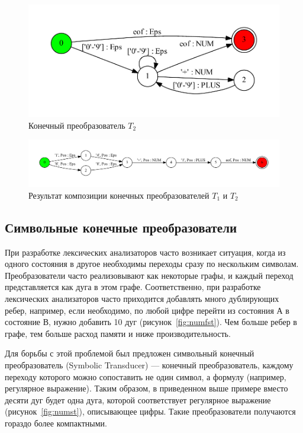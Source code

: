 \documentclass[14pt]{matmex-diploma}
\begin{document}
\begin{figure}[h!]
        \includegraphics[width=13cm]{../pictures/lexer_.pdf}
        \caption{Конечный преобразователь $T_2$}
        \label{compose2} 
\end{figure}

\begin{figure}[h!]
        \includegraphics[width=\linewidth]{../pictures/res_.pdf}
        \caption{Результат композиции конечных преобразователей $T_1$ и $T_2$}
        \label{compose3} 
\end{figure}

\subsection{Символьные конечные преобразователи}
При разработке лексических анализаторов часто возникает ситуация, когда из одного состояния в другое необходимы переходы сразу по нескольким символам. Преобразователи часто реализовывают как некоторые графы, и каждый переход представляется как дуга в этом графе. Соответственно, при разработке лексических анализаторов часто приходится добавлять много дублирующих ребер, например, если необходимо, по любой цифре перейти из состояния А в состояние В, нужно добавить 10 дуг (рисунок~\ref{fig:numfst}). Чем больше ребер в графе, тем больше расход памяти и ниже производительность.

Для борьбы с этой проблемой был предложен символьный конечный преобразователь (Symbolic Transducer) --- конечный преобразователь,  каждому переходу которого можно сопоставить не один символ, а формулу (например, регулярное выражение). Таким образом, в приведенном выше примере вместо десяти дуг будет одна дуга, которой соответствует регулярное выражение (рисунок~\ref{fig:numst}), описывающее цифры. Такие преобразователи получаются гораздо более компактными. 
\end{document}
